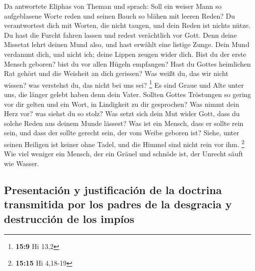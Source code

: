  Da antwortete Eliphas von Theman und sprach:
 Soll ein weiser Mann so aufgeblasene Worte reden und
seinen Bauch so blähen mit leeren Reden?  Du verantwortest
dich mit Worten, die nicht taugen, und dein Reden ist nichts nütze.
 Du hast die Furcht fahren lassen und redest verächtlich
vor Gott.  Denn deine Missetat lehrt deinen Mund also, und
hast erwählt eine listige Zunge.  Dein Mund verdammt dich,
und nicht ich; deine Lippen zeugen wider dich.  Bist du
der erste Mensch geboren? bist du vor allen Hügeln empfangen?
 Hast du Gottes heimlichen Rat gehört und die Weisheit an
dich gerissen?  Was weißt du, das wir nicht wissen? was
verstehst du, das nicht bei uns sei? \footnote{\textbf{15:9} Hi 13,2}
 Es sind Graue und Alte unter uns, die länger gelebt
haben denn dein Vater.  Sollten Gottes Tröstungen so
gering vor dir gelten und ein Wort, in Lindigkeit zu dir gesprochen?
 Was nimmt dein Herz vor? was siehst du so stolz?
 Was setzt sich dein Mut wider Gott, dass du solche Reden
aus deinem Munde lässest?  Was ist ein Mensch, dass er
sollte rein sein, und dass der sollte gerecht sein, der vom Weibe
geboren ist?  Siehe, unter seinen Heiligen ist keiner
ohne Tadel, und die Himmel sind nicht rein vor ihm. \footnote{\textbf{15:15}
  Hi 4,18-19}  Wie viel weniger ein Mensch, der ein
Gräuel und schnöde ist, der Unrecht säuft wie Wasser.

\hypertarget{presentaciuxf3n-y-justificaciuxf3n-de-la-doctrina-transmitida-por-los-padres-de-la-desgracia-y-destrucciuxf3n-de-los-impuxedos}{%
\subsection{Presentación y justificación de la doctrina transmitida por
los padres de la desgracia y destrucción de los
impíos}\label{presentaciuxf3n-y-justificaciuxf3n-de-la-doctrina-transmitida-por-los-padres-de-la-desgracia-y-destrucciuxf3n-de-los-impuxedos}}

